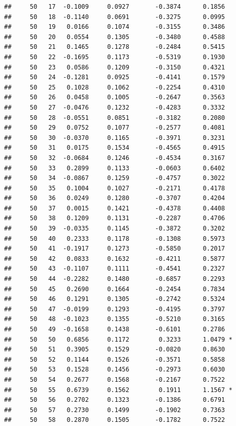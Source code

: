 \documentclass[
]{article}
\begin{document}
\begin{verbatim}
##     50   17  -0.1009     0.0927       -0.3874      0.1856  
##     50   18  -0.1140     0.0691       -0.3275      0.0995  
##     50   19   0.0166     0.1074       -0.3155      0.3486  
##     50   20   0.0554     0.1305       -0.3480      0.4588  
##     50   21   0.1465     0.1278       -0.2484      0.5415  
##     50   22  -0.1695     0.1173       -0.5319      0.1930  
##     50   23   0.0586     0.1209       -0.3150      0.4321  
##     50   24  -0.1281     0.0925       -0.4141      0.1579  
##     50   25   0.1028     0.1062       -0.2254      0.4310  
##     50   26   0.0458     0.1005       -0.2647      0.3563  
##     50   27  -0.0476     0.1232       -0.4283      0.3332  
##     50   28  -0.0551     0.0851       -0.3182      0.2080  
##     50   29   0.0752     0.1077       -0.2577      0.4081  
##     50   30  -0.0370     0.1165       -0.3971      0.3231  
##     50   31   0.0175     0.1534       -0.4565      0.4915  
##     50   32  -0.0684     0.1246       -0.4534      0.3167  
##     50   33   0.2899     0.1133       -0.0603      0.6402  
##     50   34  -0.0867     0.1259       -0.4757      0.3022  
##     50   35   0.1004     0.1027       -0.2171      0.4178  
##     50   36   0.0249     0.1280       -0.3707      0.4204  
##     50   37   0.0015     0.1421       -0.4378      0.4408  
##     50   38   0.1209     0.1131       -0.2287      0.4706  
##     50   39  -0.0335     0.1145       -0.3872      0.3202  
##     50   40   0.2333     0.1178       -0.1308      0.5973  
##     50   41  -0.1917     0.1273       -0.5850      0.2017  
##     50   42   0.0833     0.1632       -0.4211      0.5877  
##     50   43  -0.1107     0.1111       -0.4541      0.2327  
##     50   44  -0.2282     0.1480       -0.6857      0.2293  
##     50   45   0.2690     0.1664       -0.2454      0.7834  
##     50   46   0.1291     0.1305       -0.2742      0.5324  
##     50   47  -0.0199     0.1293       -0.4195      0.3797  
##     50   48  -0.1023     0.1355       -0.5210      0.3165  
##     50   49  -0.1658     0.1438       -0.6101      0.2786  
##     50   50   0.6856     0.1172        0.3233      1.0479 *
##     50   51   0.3905     0.1529       -0.0820      0.8630  
##     50   52   0.1144     0.1526       -0.3571      0.5858  
##     50   53   0.1528     0.1456       -0.2973      0.6030  
##     50   54   0.2677     0.1568       -0.2167      0.7522  
##     50   55   0.6739     0.1562        0.1911      1.1567 *
##     50   56   0.2702     0.1323       -0.1386      0.6791  
##     50   57   0.2730     0.1499       -0.1902      0.7363  
##     50   58   0.2870     0.1505       -0.1782      0.7522  

\end{verbatim}
\end{document}
